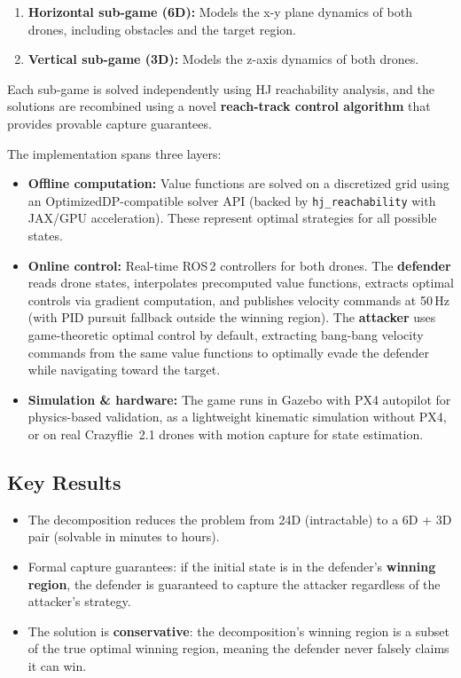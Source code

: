 \documentclass[11pt,a4paper]{article}
\begin{document}
\begin{enumerate}
    \item \textbf{Horizontal sub-game (6D):} Models the x-y plane dynamics of both drones, including obstacles and the target region.
    \item \textbf{Vertical sub-game (3D):} Models the z-axis dynamics of both drones.
\end{enumerate}

Each sub-game is solved independently using HJ reachability analysis, and the solutions are recombined using a novel \textbf{reach-track control algorithm} that provides provable capture guarantees.

The implementation spans three layers:

\begin{itemize}
    \item \textbf{Offline computation:} Value functions are solved on a discretized grid using an OptimizedDP-compatible solver API (backed by \texttt{hj\_reachability} with JAX/GPU acceleration). These represent optimal strategies for all possible states.
    \item \textbf{Online control:} Real-time ROS\,2 controllers for both drones. The \textbf{defender} reads drone states, interpolates precomputed value functions, extracts optimal controls via gradient computation, and publishes velocity commands at 50\,Hz (with PID pursuit fallback outside the winning region). The \textbf{attacker} uses game-theoretic optimal control by default, extracting bang-bang velocity commands from the same value functions to optimally evade the defender while navigating toward the target.
    \item \textbf{Simulation \& hardware:} The game runs in Gazebo with PX4 autopilot for physics-based validation, as a lightweight kinematic simulation without PX4, or on real Crazyflie~2.1 drones with motion capture for state estimation.
\end{itemize}

\subsection{Key Results}

\begin{itemize}
    \item The decomposition reduces the problem from 24D (intractable) to a 6D + 3D pair (solvable in minutes to hours).
    \item Formal capture guarantees: if the initial state is in the defender's \textbf{winning region}, the defender is guaranteed to capture the attacker regardless of the attacker's strategy.
    \item The solution is \textbf{conservative}: the decomposition's winning region is a subset of the true optimal winning region, meaning the defender never falsely claims it can win.
\end{itemize}
\end{document}
